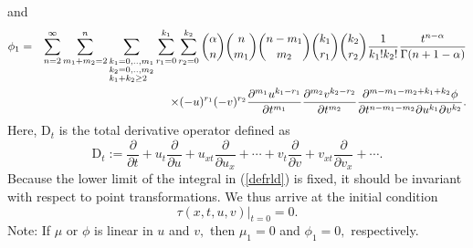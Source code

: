 \documentclass[12pt]{amsart}
\begin{document}
and
\begin{eqnarray*}
\phi_1 &=& \sum_{n=2}^\infty\sum_{m_1+m_2=2}^n\sum_{\begin{subarray}
~k_1=0,..,m_1\\
k_2=0,..,m_2\\
k_1+k_2\geq 2
\end{subarray}}\sum_{r_1=0}^{k_1}\sum_{r_2=0}^{k_2}\binom{\alpha}{n}\binom{n}{m_1}
 \binom{n-m_1}{m_2}\binom{k_1}{r_1}\binom{k_2}{r_2} \frac{1}{k_1!k_2!}
\frac{t^{n-\alpha}}{\Gamma(n+1-\alpha)}\\
&&\times (-u)^{r_1}(-v)^{r_2}\frac{\partial^{m_1}u^{k_1-r_1}}{\partial t^{m_1}}\frac{\partial^{m_2}v^{k_2-r_2}}{\partial t^{m_2}}
\frac{\partial^{m-m_1-m_2+k_1+k_2}\phi}{\partial t^{n-m_1-m_2}\partial u^{k_1}\partial v^{k_2}}.
\end{eqnarray*}
Here, $\mathrm{D}_t$ is the total derivative operator defined as
\begin{equation*}
\mathrm{D}_t  :=  \frac{\partial}{\partial t}+u_t\frac{\partial}{\partial u}+u_{xt}\frac{\partial}{\partial u_x}+\cdots
+v_t\frac{\partial}{\partial v}+v_{xt}\frac{\partial}{\partial v_x}+\cdots.
\end{equation*}
Because the lower limit of the integral in (\ref{defrld}) is fixed, it should be invariant with respect to point transformations. We thus arrive at the initial condition
\begin{equation}\label{incon}
\tau(x,t,u,v)|_{t=0}=0.
\end{equation}
Note: If $\mu$ or $\phi$ is linear in $u$ and $v,$ then $\mu_1=0$ and $\phi_1=0,$ respectively.
\end{document}
